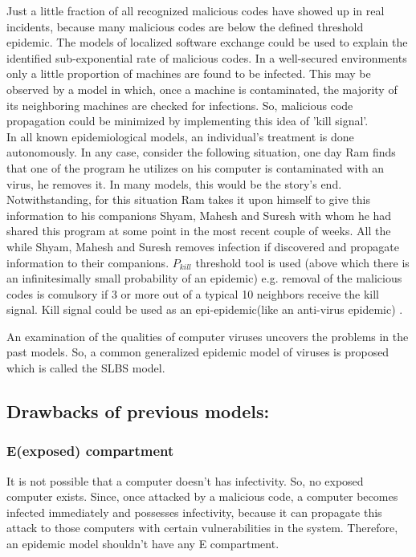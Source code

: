 Just a little fraction of all recognized malicious codes have showed up in real incidents, because many malicious codes are below the defined threshold epidemic. The models of localized software exchange could be used to explain the identified sub-exponential rate of malicious codes. In a well-secured environments only a little proportion of machines are found to be infected. This may be observed by a model in which, once a machine is contaminated, the majority of its neighboring machines are checked for infections. So, malicious code propagation could be minimized by implementing this idea of 'kill signal'. \\
In all known epidemiological models, an individual's treatment is done autonomously.  In any case, consider the following situation, one day Ram finds that one of the program he utilizes on his computer is contaminated with an virus, he removes it. In many models, this would be the story's end. Notwithstanding, for this situation Ram takes it upon himself to give this information to his companions Shyam, Mahesh and Suresh with whom he had shared this program at some point in the most recent couple of weeks. All the while Shyam, Mahesh and Suresh removes infection if discovered and propagate information to their companions.
$P_{kill}$ threshold tool is used (above which there is an infinitesimally small probability of an epidemic) e.g. removal of the malicious codes is comulsory if 3 or more out of a typical 10 neighbors receive the kill signal. Kill signal could be used as an epi-epidemic(like an anti-virus epidemic) \cite{kephart1993computers}.

An examination of the qualities of computer viruses uncovers the problems in the past models. So, a common generalized epidemic model of viruses is proposed which is called the SLBS model.

\subsection{Drawbacks of previous models:}

\subsubsection{E(exposed) compartment}
It is not possible that a computer doesn't has infectivity. So, no exposed computer exists. Since,
once attacked by a malicious code, a computer becomes infected immediately and possesses infectivity, because it can propagate this attack to those computers with certain vulnerabilities in the system. Therefore, an epidemic model shouldn't have any E compartment.
